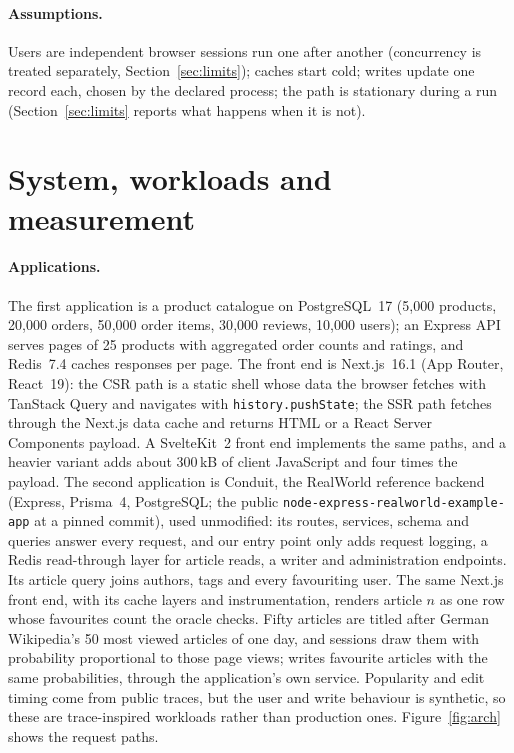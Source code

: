\documentclass[acmsmall,review,nonacm]{acmart}
\begin{document}
\paragraph{Assumptions.} Users are independent browser sessions run one after another (concurrency is treated separately, Section~\ref{sec:limits}); caches start cold; writes update one record each, chosen by the declared process; the path is stationary during a run (Section~\ref{sec:limits} reports what happens when it is not).

\section{System, workloads and measurement}
\label{sec:system}

\paragraph{Applications.}
The first application is a product catalogue on PostgreSQL~17 (5{,}000 products, 20{,}000 orders, 50{,}000 order items, 30{,}000 reviews, 10{,}000 users); an Express API serves pages of 25 products with aggregated order counts and ratings, and Redis~7.4 caches responses per page. The front end is Next.js~16.1 (App Router, React~19): the CSR path is a static shell whose data the browser fetches with TanStack Query and navigates with \texttt{history.pushState}; the SSR path fetches through the Next.js data cache and returns HTML or a React Server Components payload. A SvelteKit~2 front end implements the same paths, and a heavier variant adds about 300\,kB of client JavaScript and four times the payload.
The second application is Conduit, the RealWorld reference backend (Express, Prisma~4, PostgreSQL; the public \texttt{node-express-realworld-example-app} at a pinned commit), used unmodified: its routes, services, schema and queries answer every request, and our entry point only adds request logging, a Redis read-through layer for article reads, a writer and administration endpoints. Its article query joins authors, tags and every favouriting user. The same Next.js front end, with its cache layers and instrumentation, renders article $n$ as one row whose favourites count the oracle checks. Fifty articles are titled after German Wikipedia's 50 most viewed articles of one day, and sessions draw them with probability proportional to those page views; writes favourite articles with the same probabilities, through the application's own service. Popularity and edit timing come from public traces, but the user and write behaviour is synthetic, so these are trace-inspired workloads rather than production ones.
Figure~\ref{fig:arch} shows the request paths.
\end{document}
